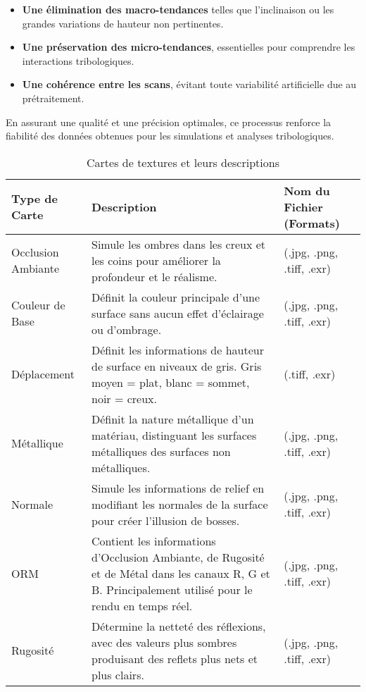 \begin{itemize}
    \item \textbf{Une élimination des macro-tendances} telles que l’inclinaison ou les grandes variations de hauteur non pertinentes.
    \item \textbf{Une préservation des micro-tendances}, essentielles pour comprendre les interactions tribologiques.
    \item \textbf{Une cohérence entre les scans}, évitant toute variabilité artificielle due au prétraitement.
\end{itemize}

\noindent En assurant une qualité et une précision optimales, ce processus renforce la fiabilité des données obtenues pour les simulations et analyses tribologiques.



\begin{table}[h]
    \centering
    \renewcommand{\arraystretch}{1.3}
    \begin{tabular}{|p{3cm}|p{8cm}|p{6cm}|}
        \hline
        \textbf{Type de Carte} & \textbf{Description} & \textbf{Nom du Fichier (Formats)} \\ \hline
        Occlusion Ambiante & Simule les ombres dans les creux et les coins pour améliorer la profondeur et le réalisme. & (.jpg, .png, .tiff, .exr) \\ \hline
        Couleur de Base & Définit la couleur principale d'une surface sans aucun effet d'éclairage ou d'ombrage. &  (.jpg, .png, .tiff, .exr) \\ \hline
        Déplacement & Définit les informations de hauteur de surface en niveaux de gris. Gris moyen = plat, blanc = sommet, noir = creux. &  (.tiff, .exr) \\ \hline
        Métallique & Définit la nature métallique d'un matériau, distinguant les surfaces métalliques des surfaces non métalliques. &  (.jpg, .png, .tiff, .exr) \\ \hline
        Normale & Simule les informations de relief en modifiant les normales de la surface pour créer l'illusion de bosses. &  (.jpg, .png, .tiff, .exr) \\ \hline
        ORM & Contient les informations d'Occlusion Ambiante, de Rugosité et de Métal dans les canaux R, G et B. Principalement utilisé pour le rendu en temps réel. &  (.jpg, .png, .tiff, .exr) \\ \hline
        Rugosité & Détermine la netteté des réflexions, avec des valeurs plus sombres produisant des reflets plus nets et plus clairs. & (.jpg, .png, .tiff, .exr) \\ \hline
    \end{tabular}
    \caption{Cartes de textures et leurs descriptions}
    \label{tab:cartes_textures}
\end{table}



